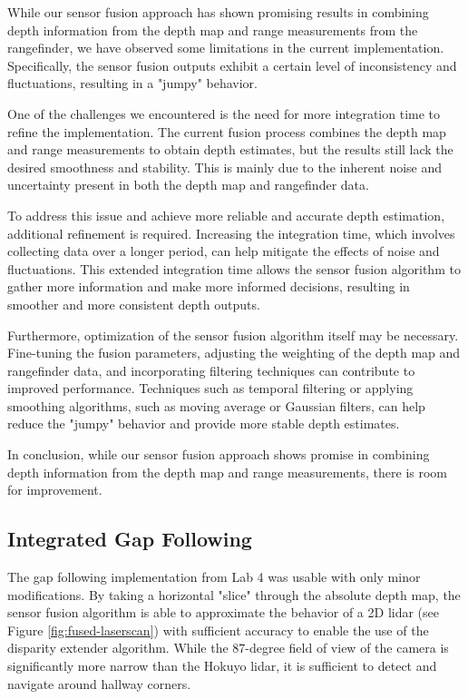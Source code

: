 \documentclass[conference]{IEEEtran}
\begin{document}
While our sensor fusion approach has shown promising results in combining depth information from the depth map and range measurements from the rangefinder, we have observed some limitations in the current implementation. Specifically, the sensor fusion outputs exhibit a certain level of inconsistency and fluctuations, resulting in a "jumpy" behavior.

One of the challenges we encountered is the need for more integration time to refine the implementation. The current fusion process combines the depth map and range measurements to obtain depth estimates, but the results still lack the desired smoothness and stability. This is mainly due to the inherent noise and uncertainty present in both the depth map and rangefinder data.

To address this issue and achieve more reliable and accurate depth estimation, additional refinement is required. Increasing the integration time, which involves collecting data over a longer period, can help mitigate the effects of noise and fluctuations. This extended integration time allows the sensor fusion algorithm to gather more information and make more informed decisions, resulting in smoother and more consistent depth outputs.

Furthermore, optimization of the sensor fusion algorithm itself may be necessary. Fine-tuning the fusion parameters, adjusting the weighting of the depth map and rangefinder data, and incorporating filtering techniques can contribute to improved performance. Techniques such as temporal filtering or applying smoothing algorithms, such as moving average or Gaussian filters, can help reduce the "jumpy" behavior and provide more stable depth estimates.

In conclusion, while our sensor fusion approach shows promise in combining depth information from the depth map and range measurements, there is room for improvement. 

\subsection{Integrated Gap Following}
The gap following implementation from Lab 4 was usable with only minor
modifications. By taking a horizontal "slice" through the absolute depth map,
the sensor fusion algorithm is able to approximate the behavior of a 2D lidar
(see Figure \ref{fig:fused-laserscan}) with sufficient accuracy to enable the
use of the disparity extender algorithm. While the 87-degree field of view of
the camera is significantly more narrow than the Hokuyo lidar, it is sufficient
to detect and navigate around hallway corners.
\end{document}
